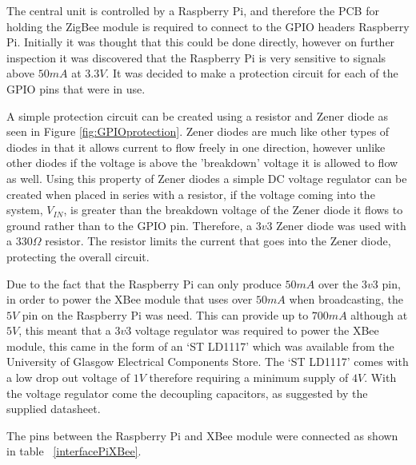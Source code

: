 

The central unit is controlled by a Raspberry Pi, and therefore the PCB for holding the ZigBee module is required to connect to the GPIO headers Raspberry Pi.  Initially it was thought that this could be done directly, however on further inspection it was discovered that the Raspberry Pi is very sensitive to signals above $50\unit{mA}$ at $3.3\unit{V}$. It was decided to make a protection circuit for each of the GPIO pins that were in use. 

A simple protection circuit can be created using a resistor and Zener diode as seen in Figure \ref{fig:GPIOprotection}. Zener diodes are much like other types of diodes in that it allows current to flow freely in one direction, however unlike other diodes if the voltage is above the 'breakdown' voltage it is allowed to flow as well. Using this property of Zener diodes a simple DC voltage regulator can be created when placed in series with a resistor, if the voltage coming into the system, $V_{IN}$, is greater than the breakdown voltage of the Zener diode it flows to ground rather than to the GPIO pin. Therefore, a $3v3$ Zener diode was used with a $330\Omega$ resistor. The resistor limits the current that goes into the Zener diode, protecting the overall circuit.

Due to the fact that the Raspberry Pi can only produce $50\unit{mA}$ over the $3v3$ pin, in order to power the XBee module that uses over $50\unit{mA}$ when broadcasting, the $5\unit{V}$ pin on the Raspberry Pi was need. This can provide up to $700\unit{mA}$ although at $5\unit{V}$, this meant that a $3v3$ voltage regulator was required to power the XBee module, this came in the form of an `ST LD1117' which was available from the University of Glasgow Electrical Components Store. The `ST LD1117' comes with a low drop out voltage of $1\unit{V}$ therefore requiring a minimum supply of $4\unit{V}$. With the voltage regulator come the decoupling capacitors, as suggested by the supplied datasheet.

The pins between the Raspberry Pi and XBee module were connected as shown in table ~\ref{interfacePiXBee}.

